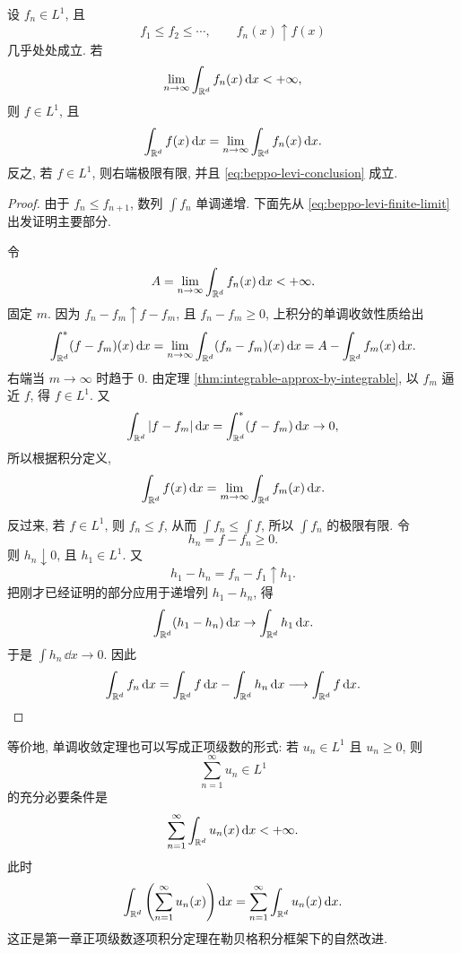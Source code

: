 \begin{thm}
	\label{thm:beppo-levi-l1}
	设 \(f_n\in L^1\), 且
	\[
	f_1\leq f_2\leq\cdots,
	\qquad
	f_n(x)\uparrow f(x)
	\]
	几乎处处成立. 若
	\begin{equation}
		\lim_{n\to\infty}\int_{\mathbb{R}^d}f_n(x)\,\dd x<+\infty,
		\label{eq:beppo-levi-finite-limit}
	\end{equation}
	则 \(f\in L^1\), 且
	\begin{equation}
		\int_{\mathbb{R}^d}f(x)\,\dd x
		=
		\lim_{n\to\infty}\int_{\mathbb{R}^d}f_n(x)\,\dd x.
		\label{eq:beppo-levi-conclusion}
	\end{equation}
	反之, 若 \(f\in L^1\), 则右端极限有限, 并且 \eqref{eq:beppo-levi-conclusion} 成立.
\end{thm}

\begin{proof}
	由于 \(f_n\leq f_{n+1}\), 数列 \(\int f_n\) 单调递增. 下面先从 \eqref{eq:beppo-levi-finite-limit} 出发证明主要部分.
	
	令
	\[
	A=\lim_{n\to\infty}\int_{\mathbb{R}^d}f_n(x)\,\dd x<+\infty.
	\]
	固定 \(m\). 因为 \(f_n-f_m\uparrow f-f_m\), 且 \(f_n-f_m\geq0\), 上积分的单调收敛性质给出
	\[
	\int_{\mathbb{R}^d}^{*}(f-f_m)(x)\,\dd x
	=
	\lim_{n\to\infty}\int_{\mathbb{R}^d}(f_n-f_m)(x)\,\dd x
	=
	A-
	\int_{\mathbb{R}^d}f_m(x)\,\dd x.
	\]
	右端当 \(m\to\infty\) 时趋于 \(0\). 由定理 \ref{thm:integrable-approx-by-integrable}, 以 \(f_m\) 逼近 \(f\), 得 \(f\in L^1\). 又
	\[
	\int_{\mathbb{R}^d}|f-f_m|\,\dd x
	=
	\int_{\mathbb{R}^d}^{*}(f-f_m)\,\dd x\to0,
	\]
	所以根据积分定义,
	\[
	\int_{\mathbb{R}^d}f(x)\,\dd x
	=
	\lim_{m\to\infty}\int_{\mathbb{R}^d}f_m(x)\,\dd x.
	\]
	
	反过来, 若 \(f\in L^1\), 则 \(f_n\leq f\), 从而 \(\int f_n\leq \int f\), 所以 \(\int f_n\) 的极限有限. 令
	\[
	h_n=f-f_n\geq0.
	\]
	则 \(h_n\downarrow0\), 且 \(h_1\in L^1\). 又
	\[
	h_1-h_n=f_n-f_1\uparrow h_1.
	\]
	把刚才已经证明的部分应用于递增列 \(h_1-h_n\), 得
	\[
	\int_{\mathbb{R}^d}(h_1-h_n)\,\dd x\to \int_{\mathbb{R}^d}h_1\,\dd x.
	\]
	于是 \(\int h_n\,\dd x\to0\). 因此
	\[
	\int_{\mathbb{R}^d}f_n\,\dd x
	=
	\int_{\mathbb{R}^d}f\,\dd x-
	\int_{\mathbb{R}^d}h_n\,\dd x
	\longrightarrow
	\int_{\mathbb{R}^d}f\,\dd x.
	\]
\end{proof}

等价地, 单调收敛定理也可以写成正项级数的形式: 若 \(u_n\in L^1\) 且 \(u_n\geq0\), 则
\[
\sum_{n=1}^{\infty}u_n\in L^1
\]
的充分必要条件是
\[
\sum_{n=1}^{\infty}\int_{\mathbb{R}^d}u_n(x)\,\dd x<+\infty.
\]
此时
\begin{equation}
	\int_{\mathbb{R}^d}\left(\sum_{n=1}^{\infty}u_n(x)\right)\dd x
	=
	\sum_{n=1}^{\infty}\int_{\mathbb{R}^d}u_n(x)\,\dd x.
	\label{eq:beppo-levi-series-form}
\end{equation}
这正是第一章正项级数逐项积分定理在勒贝格积分框架下的自然改进.

